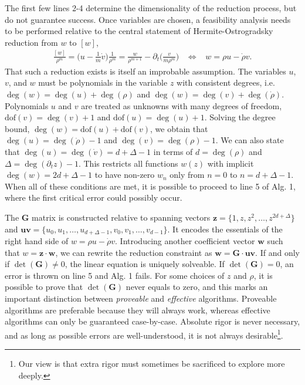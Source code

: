\documentclass[nofootinbib,preprint]{revtex4-1}
\begin{document}
The first few lines 2-4 determine the dimensionality of the reduction process, but 
do not guarantee success. Once variables are chosen, a feasibility analysis needs to 
be performed relative to the central statement of Hermite-Ostrogradsky reduction 
from $w$ to $[w]$, 
\begin{eqnarray}
\frac{[w]}{\rho^{m}}=\Big(u-\frac{1}{m}\dot{v}\Big)\frac{1}{\rho^{m}} = 
\frac{w}{\rho^{m+1}}-\partial_t\bigg( \frac{v}{m\rho^{m}}\bigg) 
\;\;\; \iff \;\;\; 
 w = \rho u -\dot{\rho} v \nonumber.
\end{eqnarray}
That such a reduction exists is itself an improbable assumption. The variables $u$, 
$v$, and $w$ must be polynomials in the variable $z$ with consistent degrees, i.e. 
$\deg(w)=\deg(u)+\deg(\rho)$ and $\deg(w)=\deg(v)+\deg(\dot{\rho})$. Polynomials $u$ and $v$ are 
treated as unknowns with many degrees of freedom, $\text{dof}(v)=\deg(v)+1$ and 
$\text{dof}(u)=\deg(u)+1$. Solving the degree bound, $\deg(w)=\text{dof}(u)+\text{dof}(v)$,
we obtain that $\deg(u)=\deg(\dot{\rho})-1$ and $\deg(v)=\deg(\rho)-1$. We can also state that 
$\deg(u)=\deg(\dot{v})=d+\Delta-1$ in terms of $d=\deg(\rho)$ and  ${\Delta = \deg(\partial_t z)-1}$. 
This restricts all functions $w(z)$ with implicit $\deg(w)=2d+\Delta-1$ to have non-zero $w_n$ only 
from $n=0$ to $n=d+\Delta-1$. When all of these conditions are met, it is possible to proceed 
to line 5 of Alg. 1, where the first critical error could possibly occur. 

The $\mathbf{G}$ matrix is constructed relative to spanning vectors 
$\mathbf{z}=\{1,z,z^2,\ldots,z^{2d+\Delta}\}$ and  
$\mathbf{uv}=\{u_0,u_1,\ldots,u_{d+\Delta-1},v_0,v_1,\ldots,v_{d-1} \}$. 
It encodes the essentials of the right hand
side of $w=\rho u - \dot{\rho} v$. Introducing another coefficient vector $\mathbf{w}$ such that 
$w=\mathbf{z}\cdot\mathbf{w}$, we can rewrite the reduction constraint as 
$\mathbf{w}=\mathbf{G} \cdot \mathbf{uv}$. If and only if $\det(\mathbf{G})\neq0$, the linear equation 
is uniquely solveable. If $\det(\mathbf{G}) = 0$, an error is thrown on line 5 and Alg. 1 fails. For 
some choices of $z$ and $\rho$, it is possible to prove that $\det(\mathbf{G})$ never equals to zero,
and this marks an important distinction between \textit{proveable} and \textit{effective} algorithms.
Proveable algorithms are preferable because they will always work, whereas effective algorithms can
only be guaranteed case-by-case. Absolute rigor is never necessary, and as long as possible errors 
are well-understood, it is not always desirable\footnote{Our view is that extra rigor must sometimes be 
sacrificed to explore more deeply.}.
\end{document}
